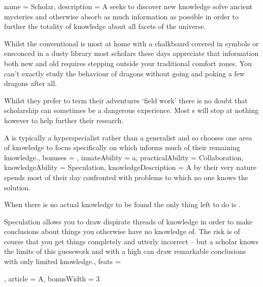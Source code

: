 \archetype
{
	name = Scholar,
	description = A \bname{} seeks to discover new knowledge\comma{} solve ancient mysteries and otherwise absorb as much information as possible\comma{} in order to further the totality of knowledge about all facets of the universe. 

Whilst the conventional \bname{} is most at home with a chalkboard covered in symbols\comma{} or ensconced in a dusty library\comma{} most scholars these days appreciate that information\comma{} both new and old\comma{} requires stepping outside your traditional comfort zones. You can’t exactly study the behaviour of dragons without going and poking a few dragons\comma{} after all. 

Whilst they prefer to term their adventures `field work’\comma{} there is no doubt that scholarship can sometimes be a dangerous experience. Most \bname{}s will stop at nothing\comma{} however\comma{} to help further their research. 

A \bname{} is typically a hyper\minus{}specialist\comma{} rather than a generalist\comma{} and so chooses one area of knowledge to focus specifically on\comma{} which informs much of their remaining knowledge.,
	bonuses = 
,
	innateAbility = a,
	practicalAbility = Collaboration,
	knowledgeAbility = Speculation,
	knowledgeDescription = A \bname{}\comma{} by their very nature\comma{} spends most of their day confronted with problems to which no one knows the solution. 

When there is no actual knowledge to be found\comma{} the only thing left to do is . 

Speculation allows you to draw dispirate threads of knowledge\comma{} in order to make conclusions about things you otherwise have no knowledge of. The risk is\comma{} of course\comma{} that you get things completely and utterly incorrect – but a scholar knows the limits of this guesswork\comma{} and with a high  can draw remarkable conclusions with only limited knowledge.,
	feats = 

,
	article = A,
	bonusWidth = 3
}

